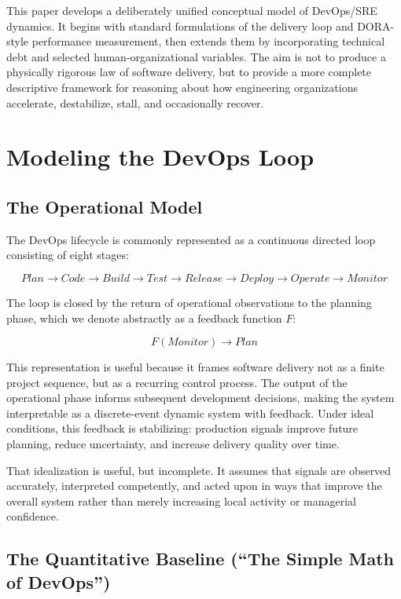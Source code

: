 \documentclass[letterpaper]{article}
\begin{document}
This paper develops a deliberately unified conceptual model of DevOps/SRE dynamics. It begins with standard formulations of the delivery loop and DORA-style performance measurement, then extends them by incorporating technical debt and selected human-organizational variables. The aim is not to produce a physically rigorous law of software delivery, but to provide a more complete descriptive framework for reasoning about how engineering organizations accelerate, destabilize, stall, and occasionally recover.


\section{Modeling the DevOps Loop}

\subsection{The Operational Model}

The DevOps lifecycle is commonly represented as a continuous directed loop consisting of eight stages:

\[
Plan \to Code \to Build \to Test \to Release \to Deploy \to Operate \to Monitor
\]

The loop is closed by the return of operational observations to the planning phase, which we denote abstractly as a feedback function $F$:

\[
F(\textit{Monitor}) \to \textit{Plan}
\]

This representation is useful because it frames software delivery not as a finite project sequence, but as a recurring control process. The output of the operational phase informs subsequent development decisions, making the system interpretable as a discrete-event dynamic system with feedback. Under ideal conditions, this feedback is stabilizing: production signals improve future planning, reduce uncertainty, and increase delivery quality over time.


That idealization is useful, but incomplete. It assumes that signals are observed accurately, interpreted competently, and acted upon in ways that improve the overall system rather than merely increasing local activity or managerial confidence.

\subsection{The Quantitative Baseline (``The Simple Math of DevOps'')}
\end{document}
